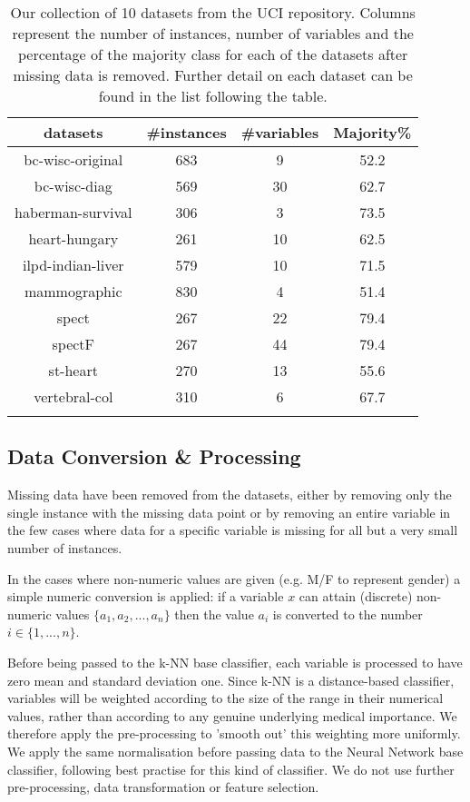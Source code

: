 \documentclass{bioinfo}
\begin{document}
\begin{methods}
\begin{table}[b]
\centering
\begin{tabular*}{8cm} {@{}c @{\extracolsep{\fill}} ccc@{}}
datasets        & \#instances  &\#variables & Majority\%\\
\midrule
bc-wisc-original&       683    &   9        &   52.2\\ 
bc-wisc-diag    &       569    &   30       &   62.7\\ 
haberman-survival&      306    &   3        &   73.5\\
heart-hungary   &       261    &   10       &   62.5\\
ilpd-indian-liver&      579    &   10       &   71.5\\
mammographic    &       830    &   4        &   51.4\\
spect           &       267    &   22       &   79.4\\
spectF          &       267    &   44       &   79.4\\
st-heart        &       270    &   13       &   55.6\\
vertebral-col   &       310    &   6        &   67.7\\
\botrule
\end{tabular*}
\caption{Our collection of 10 datasets from the UCI repository. Columns represent the number of instances, number of variables and the percentage of the majority class for each of the datasets after missing data is removed. Further detail on each dataset can be found in the list following the table.}
\label{table:datasets}
\end{table}

\subsection{Data Conversion \& Processing}

Missing data have been removed from the datasets, either by removing only the single instance with the missing data point or by removing an entire variable in the few cases where data for a specific variable is missing for all but a very small number of instances.

In the cases where non-numeric values are given (e.g. M/F to represent gender) a simple numeric conversion is applied: if a variable $x$ can attain (discrete) non-numeric values $\{a_{1}, a_{2}, ..., a_{n}\}$ then the value $a_{i}$ is converted to the number $i \in \{1,...,n\}$.

Before being passed to the k-NN base classifier, each variable is processed to have zero mean and standard deviation one. Since k-NN is a distance-based classifier, variables will be weighted according to the size of the range in their numerical values, rather than according to any genuine underlying medical importance. We therefore apply the pre-processing to 'smooth out' this weighting more uniformly. We apply the same normalisation before passing data to the Neural Network base classifier, following best practise for this kind of classifier\cite{stackexchange-neuralnet}. We do not use further pre-processing, data transformation or feature selection.



\end{methods}
\end{document}
